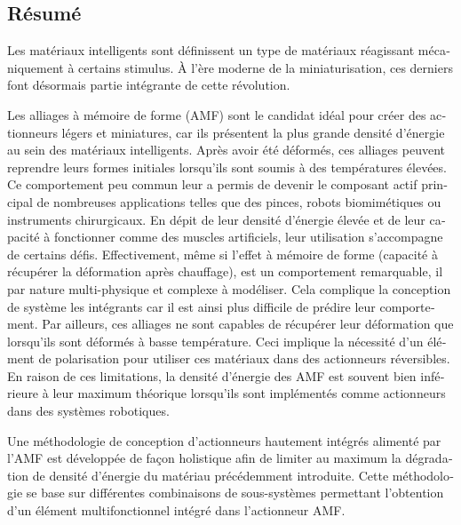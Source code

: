 \begin{otherlanguage}{french}
\cleardoublepage
\chapter*{Résumé}
Les matériaux intelligents sont définissent un type de matériaux réagissant mécaniquement à certains stimulus. À l’ère moderne de la miniaturisation, ces derniers font désormais partie intégrante de cette révolution.

Les alliages à mémoire de forme (AMF) sont le candidat idéal pour créer des actionneurs légers et miniatures, car ils présentent la plus grande densité d’énergie au sein des matériaux intelligents. Après avoir été déformés, ces alliages peuvent reprendre leurs formes initiales lorsqu’ils sont soumis à des températures élevées. Ce comportement peu commun leur a permis de devenir le composant actif principal de nombreuses applications telles que des pinces, robots biomimétiques ou instruments chirurgicaux.
En dépit de leur densité d’énergie élevée et de leur capacité à fonctionner comme des muscles artificiels, leur utilisation s’accompagne de certains défis. Effectivement, même si l’effet à mémoire de forme (capacité à récupérer la déformation après chauffage), est un comportement remarquable, il par nature multi-physique et complexe à modéliser. Cela complique la conception de système les intégrants car il est ainsi plus difficile de prédire leur comportement. Par ailleurs, ces alliages ne sont capables de récupérer leur déformation que lorsqu’ils sont déformés à basse température. Ceci implique la nécessité d’un élément de polarisation pour utiliser ces matériaux dans des actionneurs réversibles. En raison de ces limitations, la densité d’énergie des AMF est souvent bien inférieure à leur maximum théorique lorsqu’ils sont implémentés comme actionneurs dans des systèmes robotiques.

Une méthodologie de conception d’actionneurs hautement intégrés alimenté par l’AMF est développée de façon holistique afin de limiter au maximum la dégradation de densité d’énergie du matériau précédemment introduite. Cette méthodologie se base sur différentes combinaisons de sous-systèmes permettant l’obtention d’un élément multifonctionnel intégré dans l’actionneur AMF.


\end{otherlanguage}
